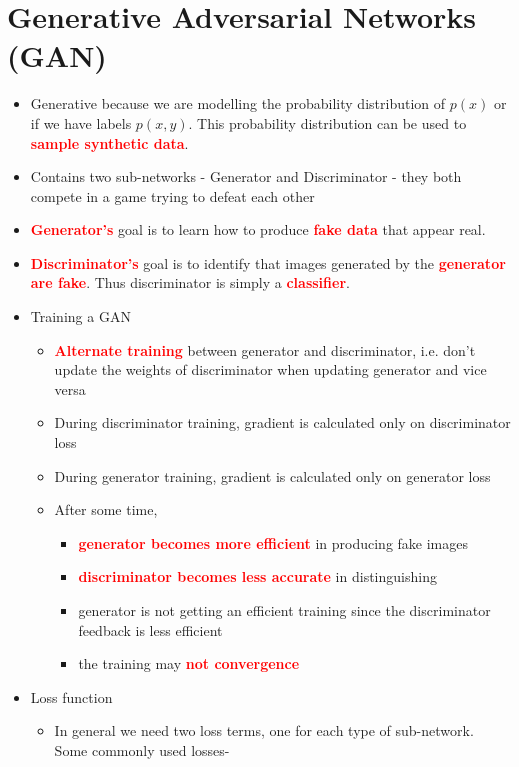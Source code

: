 \documentclass{article}
\newcommand{\redb}[1]{\textcolor{red}{\textbf{#1}}}
\begin{document}
\section{Generative Adversarial Networks (GAN)}

\begin{itemize}
    \item Generative because we are modelling the probability distribution of $p(x)$ or if we have labels $p(x,y)$. This probability distribution can be used to \redb{sample synthetic data}.
    \item Contains two sub-networks - Generator and Discriminator - they both compete in a game trying to defeat each other
    \item \redb{Generator's} goal is to learn how to produce \redb{fake data} that appear real.
    \item \redb{Discriminator's} goal is to identify that images generated by the \redb{generator are fake}. Thus discriminator is simply a \redb{classifier}.
    \item Training a GAN
        \begin{itemize}
            \item \redb{Alternate training} between generator and discriminator, i.e. don't update the weights of discriminator when updating generator and vice versa
            \item During discriminator training, gradient is calculated only on discriminator loss
            \item During generator training, gradient is calculated only on generator loss
            \item After some time,
            \begin{itemize}
                \item \redb{generator becomes more efficient} in producing fake images
                \item \redb{discriminator becomes less accurate} in distinguishing 
                \item generator is not getting an efficient training since the discriminator feedback is less efficient
                \item the training may \redb{not convergence}
            \end{itemize}
        \end{itemize}
    \item Loss function
        \begin{itemize}
            \item In general we need two loss terms, one for each type of sub-network. Some commonly used losses-

\end{itemize}
\end{itemize}
\end{document}

